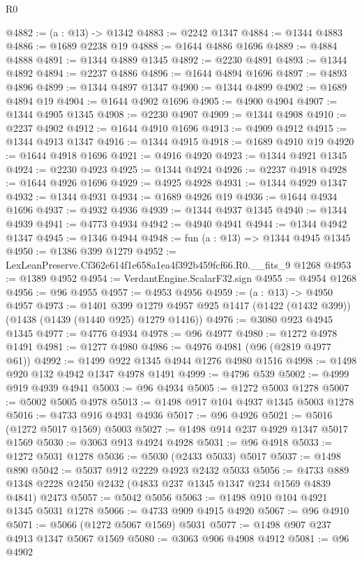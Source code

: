 \begin{lexlean}{R0}
\begin{coremodule}
@4882 := (a : @13) -> @1342
@4883 := @2242 @1347
@4884 := @1344 @4883
@4886 := @1689 @2238 @19
@4888 := @1644 @4886 @1696
@4889 := @4884 @4888
@4891 := @1344 @4889 @1345
@4892 := @2230 @4891
@4893 := @1344 @4892
@4894 := @2237 @4886
@4896 := @1644 @4894 @1696
@4897 := @4893 @4896
@4899 := @1344 @4897 @1347
@4900 := @1344 @4899
@4902 := @1689 @4894 @19
@4904 := @1644 @4902 @1696
@4905 := @4900 @4904
@4907 := @1344 @4905 @1345
@4908 := @2230 @4907
@4909 := @1344 @4908
@4910 := @2237 @4902
@4912 := @1644 @4910 @1696
@4913 := @4909 @4912
@4915 := @1344 @4913 @1347
@4916 := @1344 @4915
@4918 := @1689 @4910 @19
@4920 := @1644 @4918 @1696
@4921 := @4916 @4920
@4923 := @1344 @4921 @1345
@4924 := @2230 @4923
@4925 := @1344 @4924
@4926 := @2237 @4918
@4928 := @1644 @4926 @1696
@4929 := @4925 @4928
@4931 := @1344 @4929 @1347
@4932 := @1344 @4931
@4934 := @1689 @4926 @19
@4936 := @1644 @4934 @1696
@4937 := @4932 @4936
@4939 := @1344 @4937 @1345
@4940 := @1344 @4939
@4941 := @4773 @4934
@4942 := @4940 @4941
@4944 := @1344 @4942 @1347
@4945 := @1346 @4944
@4948 := fun (a : @13) => @1344 @4945 @1345
@4950 := @1386 @399 @1279
@4952 := LexLeanPreserve.Cf362e614f1e658a1ea4f392b459fcf66.R0.__fits_9 @1268
@4953 := @1389 @4952
@4954 := VerdantEngine.ScalarF32.sign
@4955 := @4954 @1268
@4956 := @96 @4955
@4957 := @4953 @4956
@4959 := (a : @13) -> @4950 @4957
@4973 := @1401
    @399
    @1279
    @4957
    @925
    @1417
    (@1422 (@1432 @399))
    (@1438 (@1439 (@1440 @925) @1279 @1416))
@4976 := @3080 @923 @4945 @1345
@4977 := @4776 @4934
@4978 := @96 @4977
@4980 := @1272 @4978 @1491
@4981 := @1277 @4980
@4986 := @4976 @4981 (@96 (@2819 @4977 @61))
@4992 := @1499 @922 @1345 @4944 @1276 @4980 @1516
@4998 := @1498 @920 @132 @4942 @1347 @4978 @1491
@4999 := @4796 @539
@5002 := @4999 @919 @4939 @4941
@5003 := @96 @4934
@5005 := @1272 @5003 @1278
@5007 := @5002 @5005 @4978
@5013 := @1498 @917 @104 @4937 @1345 @5003 @1278
@5016 := @4733 @916 @4931 @4936
@5017 := @96 @4926
@5021 := @5016 (@1272 @5017 @1569) @5003
@5027 := @1498 @914 @237 @4929 @1347 @5017 @1569
@5030 := @3063 @913 @4924 @4928
@5031 := @96 @4918
@5033 := @1272 @5031 @1278
@5036 := @5030 (@2433 @5033) @5017
@5037 := @1498 @890
@5042 := @5037 @912 @2229 @4923 @2432 @5033
@5056 := @4733 @889 @1348 @2228 @2450 @2432 (@4833 @237 @1345 @1347 @234 @1569 @4839 @4841) @2473
@5057 := @5042 @5056
@5063 := @1498 @910 @104 @4921 @1345 @5031 @1278
@5066 := @4733 @909 @4915 @4920
@5067 := @96 @4910
@5071 := @5066 (@1272 @5067 @1569) @5031
@5077 := @1498 @907 @237 @4913 @1347 @5067 @1569
@5080 := @3063 @906 @4908 @4912
@5081 := @96 @4902

\end{coremodule}
\end{lexlean}
